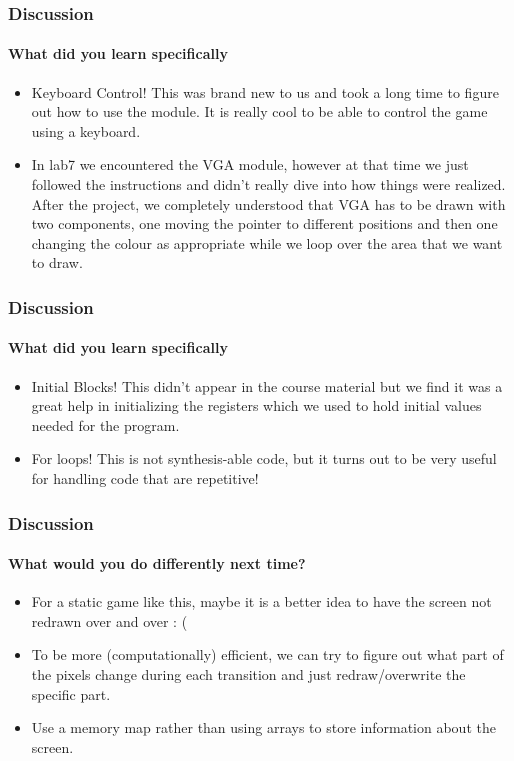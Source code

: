 \documentclass{beamer}
\begin{document}
\begin{frame}
    \frametitle{Discussion}
    \framesubtitle{What did you learn specifically}
    \begin{itemize}
        \item Keyboard Control! This was brand new to us and took a long time to figure out how to use the module. It is really cool to be able to control the game using a keyboard. 
        \item In lab7 we encountered the VGA module, however at that time we just followed the instructions and didn't really dive into how things were realized. After the project, we completely understood that VGA has to be drawn with two components, one moving the pointer to different positions and then one changing the colour as appropriate while we loop over the area that we want to draw. 
    \end{itemize}
\end{frame}

\begin{frame}
    \frametitle{Discussion}
    \framesubtitle{What did you learn specifically}
    \begin{itemize}
        \item Initial Blocks! This didn't appear in the course material but we find it was a great help in initializing the registers which we used to hold initial values needed for the program.
        \item For loops! This is not synthesis-able code, but it turns out to be very useful for handling code that are repetitive!
    \end{itemize}
\end{frame}

\begin{frame}
    \frametitle{Discussion}
    \framesubtitle{What would you do differently next time?}
    \begin{itemize}
    \item For a static game like this, maybe it is a better idea to have the screen not redrawn over and over : (
    \item To be more (computationally) efficient, we can try to figure out what part of the pixels change during each transition and just redraw/overwrite the specific part. 
    \item Use a memory map rather than using arrays to store information about the screen. 
    \end{itemize}
\end{frame}
\end{document}
